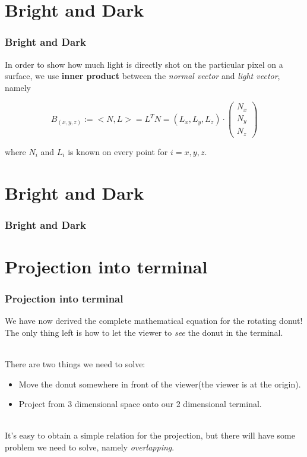 \documentclass[12pt, t]{beamer}
\renewcommand{\emph}[1]{{\color{Turquoise3}\textsl{#1}}}
\newcommand{\nullspace}{~\\[15pt]}
\begin{document}
\section{Bright and Dark}
\begin{frame}
    \frametitle{Bright and Dark}

    In order to show how much light is directly shot on the particular pixel on a
    surface, we use \textbf{inner product} between the \emph{normal vector} and \emph{light vector},
    namely

    \begin{equation*}
        B_{(x,y,z)} := <N,L> =L^T N =
        (L_x,L_y,L_z)
        \cdot
        \begin{pmatrix}
            N_x \\
            N_y \\
            N_z
        \end{pmatrix}
    \end{equation*}

    where $N_i$ and $L_i$ is known on every point for $i = x,y,z$.

\end{frame}



\section{Bright and Dark}
\begin{frame}
    \frametitle{Bright and Dark}


\end{frame}


\section{Projection into terminal}
\begin{frame}
    \frametitle{Projection into terminal}

    We have now derived the complete mathematical equation for the rotating donut! The
    only thing left is how to let the viewer to \emph{see} the donut in the terminal.

    \nullspace
    There are two things we need to solve:
    \begin{itemize}
        \item Move the donut somewhere in front of the viewer(the viewer is at the origin).
        \item Project from 3 dimensional space onto our 2 dimensional terminal.
    \end{itemize}

    \nullspace
    It's easy to obtain a simple relation for the projection, but there will have some problem
    we need to solve, namely \emph{overlapping}.

\end{frame}
\end{document}
